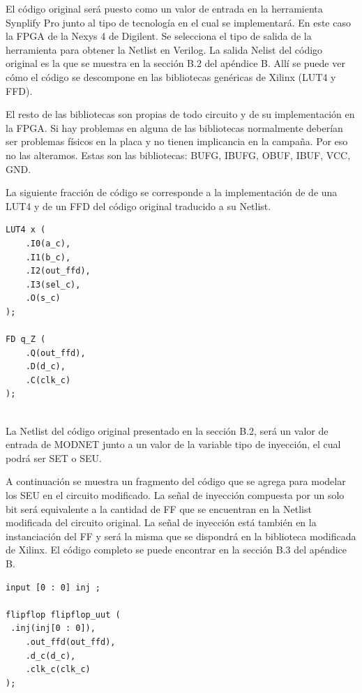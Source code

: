\documentclass[a4paper,openright,12pt]{report}
\begin{document}
El código original será puesto como un valor de entrada en la herramienta Synplify Pro junto al tipo de tecnología en el cual se implementará. En este caso la FPGA de la Nexys 4 de Digilent.
Se selecciona el tipo de salida de la herramienta para obtener  la Netlist en Verilog.
La salida Nelist del código original es la que se muestra en la sección B.2 del apéndice B. Allí se puede ver  cómo el código se descompone en las bibliotecas genéricas de Xilinx (LUT4 y FFD).

El resto de las bibliotecas son propias de todo circuito y de su implementación en la FPGA.
Si hay problemas en alguna de las bibliotecas normalmente deberían ser problemas físicos en la placa y no tienen  implicancia  en la campaña.
Por eso no las alteramos. Estas son las bibliotecas: BUFG, IBUFG, OBUF, IBUF, VCC, GND.

La siguiente fracción de código  se  corresponde a la implementación de de una LUT4 y de un FFD  del código original traducido a su Netlist.


\begin{lstlisting}
LUT4 x (
	.I0(a_c),
	.I1(b_c),
	.I2(out_ffd),
	.I3(sel_c),
	.O(s_c)
);

FD q_Z (
	.Q(out_ffd),
	.D(d_c),
	.C(clk_c)
);
		
\end{lstlisting}
	





La Netlist del código original presentado en la sección B.2, será un valor de entrada de MODNET junto a un valor de la variable tipo de inyección, el cual podrá ser SET o SEU.



A continuación se muestra  un fragmento del código que se agrega para  modelar los SEU en el circuito modificado.  La señal de inyección compuesta por un solo bit será equivalente  a la cantidad de FF que se encuentran en la Netlist modificada  del circuito original. La señal de inyección está  también en la instanciación  del FF y será la misma que se dispondrá en la biblioteca modificada de Xilinx. El código completo se puede encontrar en la sección B.3 del apéndice B.


\begin{lstlisting}
input [0 : 0] inj ;

flipflop flipflop_uut (
 .inj(inj[0 : 0]),
    .out_ffd(out_ffd),
    .d_c(d_c),
    .clk_c(clk_c)
);
\end{lstlisting}
\end{document}
